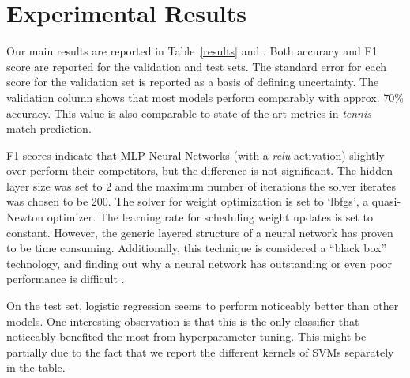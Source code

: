 \section{Experimental Results} \label{experresults}
Our main results are reported in Table~\ref{results} and .
Both accuracy and F1 score are reported for the validation and test sets. The standard error for each score for the validation set is reported as a basis of defining uncertainty. The validation column shows that most models perform comparably with approx. 70\% accuracy. This value is also comparable to state-of-the-art metrics in \textit{tennis} match prediction.

F1 scores indicate that MLP Neural Networks (with a \textit{relu} activation) slightly over-perform their competitors, but the difference is not significant. The hidden layer size was set to 2 and the maximum number of iterations the solver iterates was chosen to be 200. The solver for weight optimization is set to `lbfgs', a quasi-Newton optimizer. The learning rate for scheduling weight updates is set to constant. However, the generic layered structure of a neural network has proven to be time consuming. Additionally, this technique is considered a ``black box'' technology, and finding out why a neural network has outstanding or even poor performance is  difficult \cite{noriega2005multilayer}.

On the test set, logistic regression seems to perform  noticeably better than other models. One interesting observation is that this is the only classifier that noticeably benefited the most from hyperparameter tuning. This might be partially due to the fact that we report the different kernels of SVMs separately in the table.

